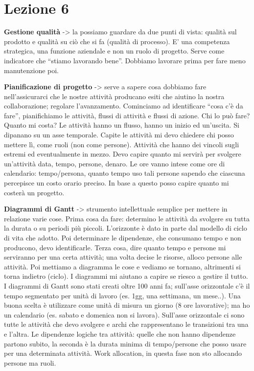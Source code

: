 



\section{Lezione 6}

\textbf{Gestione qualità} -> la possiamo guardare da due punti di vista: qualità sul prodotto e qualità su ciò che si fa (qualità di processo). E' una competenza strategica, una funzione aziendale e non un ruolo di progetto. Serve come indicatore che “stiamo lavorando bene”. Dobbiamo lavorare prima per fare meno manutenzione poi.

\textbf{Pianificazione di progetto} -> serve a sapere cosa dobbiamo fare nell'assicurarci che le nostre attività producano esiti che aiutino la nostra collaborazione; regolare l'avanzamento. Cominciamo ad identificare “cosa c'è da fare”, pianifichiamo le attività, flussi di attività e flussi di azione. Chi lo può fare? Quanto mi costa? Le attività hanno un flusso, hanno un inizio ed un'uscita. Si dipanano su un asse temporale. Capite le attività mi devo chiedere chi posso mettere lì, come ruoli (non come persone). Attività che hanno dei vincoli sugli estremi ed eventualmente in mezzo. Devo capire quanto mi servirà per svolgere un'attività data, tempo, persone, denaro. Le ore vanno intese come ore di calendario: tempo/persona, quanto tempo uso tali persone sapendo che ciascuna percepisce un costo orario preciso. In base a questo posso capire quanto mi costerà un progetto.

\textbf{Diagrammi di Gantt} -> strumento intellettuale semplice per mettere in relazione varie cose. Prima cosa da fare: determino le attività da svolgere su tutta la durata o su periodi più piccoli. L'orizzonte è dato in parte dal modello di ciclo di vita che adotto. Poi determinare le dipendenze, che consumano tempo e non producono, devo identificarle. Terza cosa, dire quanto tempo e persone mi serviranno per una certa attività; una volta decise le risorse, alloco persone alle attività. Poi mettiamo a diagramma le cose e vediamo se tornano, altrimenti si torna indietro (ciclo). I diagrammi mi aiutano a capire se riesco a gestire il tutto. I diagrammi di Gantt sono stati creati oltre 100 anni fa; sull'asse orizzontale c'è il tempo segmentato per unità di lavoro (es. 1gg, una settimana, un mese..). Una buona scelta è utilizzare come unità di misura un giorno (8 ore lavorative); ma ho un calendario (es. sabato e domenica non si lavora). Sull'asse orizzontale ci sono tutte le attività che devo svolgere e archi che rappresentano le transizioni tra una e l'altra. Le dipendenze logiche tra attività: quelle che non hanno dipendenze partono subito, la seconda è la durata minima di tempo/persone che posso usare per una determinata attività. Work allocation, in questa fase non sto 
allocando persone ma ruoli.

